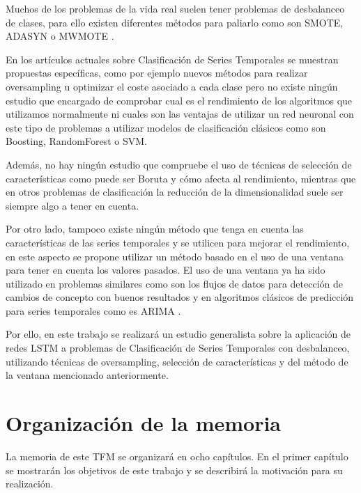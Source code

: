 Muchos de los problemas de la vida real suelen tener problemas de desbalanceo de clases, para ello existen diferentes métodos para paliarlo como son SMOTE, ADASYN o MWMOTE \cite{chawla2002smote,he2008adasyn,barua2012mwmote}.\newline

En los artículos actuales sobre Clasificación de Series Temporales se muestran propuestas específicas, como por ejemplo nuevos métodos para realizar oversampling \cite{liang2013effective} u optimizar el coste asociado a cada clase \cite{roychoudhury2017cost} pero no existe ningún estudio que encargado de comprobar cual es el rendimiento de los algoritmos que utilizamos normalmente ni cuales son las ventajas de utilizar un red neuronal con este tipo de problemas a utilizar modelos de clasificación clásicos como son Boosting, RandomForest o SVM.\newline

Además, no hay ningún estudio que compruebe el uso de técnicas de selección de características como puede ser Boruta y cómo afecta al rendimiento, mientras que en otros problemas de clasificación la reducción de la dimensionalidad suele ser siempre algo a tener en cuenta. \newline

Por otro lado, tampoco existe ningún método que tenga en cuenta las características de las series temporales y se utilicen para mejorar el rendimiento, en este aspecto se propone utilizar un método basado en el uso de una ventana para tener en cuenta los valores pasados. El uso de una ventana ya ha sido utilizado en problemas similares como son los flujos de datos para detección de cambios de concepto \cite{du2014detecting} con buenos resultados y en algoritmos clásicos de predicción para series temporales como es ARIMA \cite{hyndman2018forecasting}.\newline

Por ello, en este trabajo se realizará un estudio generalista sobre la aplicación de redes LSTM a problemas de Clasificación de Series Temporales con desbalanceo, utilizando técnicas de oversampling, selección de características y del método de la ventana mencionado anteriormente.\newline

\section{Organización de la memoria}
La memoria de este TFM se organizará en ocho capítulos. En el primer capítulo se mostrarán los objetivos de este trabajo y se describirá la motivación para su realización.\newline

